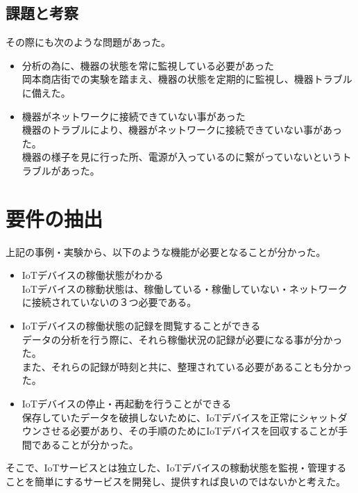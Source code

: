 \subsection{課題と考察}
その際にも次のような問題があった。
\begin{itemize}
	\item 分析の為に、機器の状態を常に監視している必要があった\\
		岡本商店街での実験を踏まえ、機器の状態を定期的に監視し、機器トラブルに備えた。
	\item 機器がネットワークに接続できていない事があった\\
		機器のトラブルにより、機器がネットワークに接続できていない事があった。\\
		機器の様子を見に行った所、電源が入っているのに繋がっていないというトラブルがあった。
\end{itemize}

\section{要件の抽出}
上記の事例・実験から、以下のような機能が必要となることが分かった。

\begin{itemize}
\item IoTデバイスの稼働状態がわかる\\
	IoTデバイスの稼動状態は、稼働している・稼働していない・ネットワークに接続されていないの３つ必要である。
\item IoTデバイスの稼働状態の記録を閲覧することができる\\
	データの分析を行う際に、それら稼働状況の記録が必要になる事が分かった。\\
	また、それらの記録が時刻と共に、整理されている必要があることも分かった。
\item IoTデバイスの停止・再起動を行うことができる\\
	保存していたデータを破損しないために、IoTデバイスを正常にシャットダウンさせる必要があり、その手順のためにIoTデバイスを回収することが手間であることが分かった。
\end{itemize}

そこで、IoTサービスとは独立した、IoTデバイスの稼動状態を監視・管理することを簡単にするサービスを開発し、提供すれば良いのではないかと考えた。





